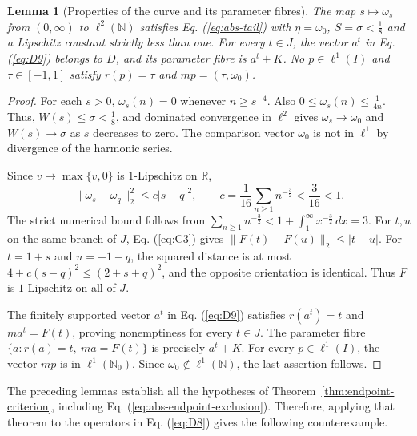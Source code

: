 \documentclass[11pt]{article}
\newcommand{\R}{\mathbb R}
\newcommand{\N}{\mathbb N}
\newcommand{\Nzero}{\mathbb N_0}
\newtheorem{lemma}{Lemma}
\theoremstyle{definition}
\theoremstyle{remark}
\begin{document}
\begin{lemma}[Properties of the curve and its parameter fibres]
\label{lem:coordinate-profile}
The map $s\mapsto\omega_s$ from $(0,\infty)$ to $\ell^2(\N)$ satisfies Eq. (\ref{eq:abs-tail}) with $\eta=\omega_0$, $S=\sigma<\frac{1}{8}$ and a Lipschitz constant strictly less than one. For every $t\in J$, the vector $a^t$ in Eq. (\ref{eq:D9}) belongs to $D$, and its parameter fibre is $a^t+K$. No $p\in\ell^1(I)$ and $\tau\in[-1,1]$ satisfy $r(p)=\tau$ and $mp=(\tau,\omega_0)$.
\end{lemma}
\begin{proof}
\label{sec:C2}
For each $s>0$, $\omega_s(n)=0$ whenever $n\ge s^{-4}$. Also $0\le\omega_s(n)\le\frac{1}{4n}$. Thus, $W(s)\le\sigma<\frac{1}{8}$, and dominated convergence in $\ell^2$ gives $\omega_s\to\omega_0$ and $W(s)\to\sigma$ as $s$ decreases to zero. The comparison vector $\omega_0$ is not in $\ell^1$ by divergence of the harmonic series.

Since $v\mapsto\max\{v,0\}$ is $1$-Lipschitz on $\R$,
\begin{equation}
\|\omega_s-\omega_q\|_2^2\le c|s-q|^2,\qquad
c=\frac1{16}\sum_{n\ge1}n^{-\frac{3}{2}}<\frac3{16}<1.
\label{eq:C3}
\end{equation}
The strict numerical bound follows from $\sum_{n\ge1}n^{-\frac{3}{2}}<1+\int_1^\infty x^{-\frac{3}{2}}\,dx=3$. For $t,u$ on the same branch of $J$, Eq. (\ref{eq:C3}) gives $\|F(t)-F(u)\|_2\le|t-u|$. For $t=1+s$ and $u=-1-q$, the squared distance is at most $4+c(s-q)^2\le(2+s+q)^2$, and the opposite orientation is identical. Thus $F$ is $1$-Lipschitz on all of $J$.

The finitely supported vector $a^t$ in Eq. (\ref{eq:D9}) satisfies $r(a^t)=t$ and $ma^t=F(t)$, proving nonemptiness for every $t\in J$. The parameter fibre $\{a:r(a)=t,\ ma=F(t)\}$ is precisely $a^t+K$. For every $p\in\ell^1(I)$, the vector $mp$ is in $\ell^1(\Nzero)$. Since $\omega_0\notin\ell^1(\N)$, the last assertion follows.
\end{proof}


The preceding lemmas establish all the hypotheses of Theorem~\ref{thm:endpoint-criterion}, including Eq. (\ref{eq:abs-endpoint-exclusion}). Therefore, applying that theorem to the operators in Eq. (\ref{eq:D8}) gives the following counterexample. 
\end{document}
